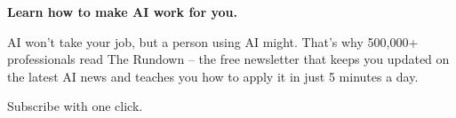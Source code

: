\vspace{2mm}
\begin{center}
\begin{minipage}{0.92\textwidth}
\small
\textbf{Learn how to make AI work for you.}

AI won’t take your job, but a person using AI might. That’s why 500,000+ professionals read The Rundown – the free newsletter that keeps you updated on the latest AI news and teaches you how to apply it in just 5 minutes a day.

Subscribe with one click.
\end{minipage}
\end{center}
\vspace*{\fill}